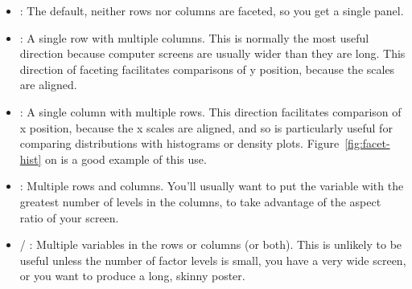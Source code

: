 \begin{itemize}
  \item {}: The default, neither rows nor columns are faceted, so you get a single panel.

    

  \item {}: A single row with multiple columns.  This is normally the most useful direction because computer screens are usually wider than they are long.  This direction of faceting facilitates comparisons of y position, because the scales are aligned.

    
  
  \item {}: A single column with multiple rows.  This direction facilitates comparison of x position, because the x scales are aligned, and so is particularly useful for comparing distributions with histograms or density plots.  Figure~\ref{fig:facet-hist} on \pageref{fig:facet-hist} is a good example of this use.

    

  \item {}: Multiple rows and columns.  You'll usually want to put the variable with the greatest number of levels in the columns, to take advantage of the aspect ratio of your screen.

    

  \item {} / :  Multiple variables in the rows or columns (or both). This is unlikely to be useful unless the number of factor levels is small, you have a very wide screen, or you want to produce a long, skinny poster.

    

\end{itemize}

